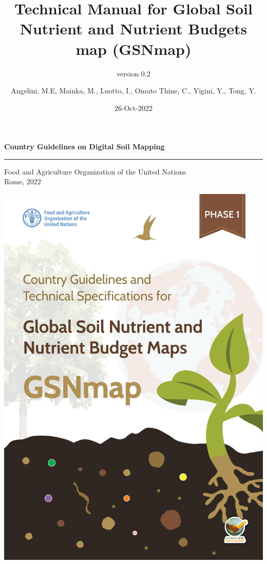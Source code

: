 \documentclass[
  10pt,
  b5paper,
  oneside]{book}
\title{
Technical Manual for Global Soil Nutrient and Nutrient Budgets map (GSNmap)}
\subtitle{version 0.2}
\author{Angelini, M.E, Mainka, M., Luotto, I., Omuto Thine, C., Yigini, Y., Tong, Y.}
\date{26-Oct-2022}
\newcommand\blankpage{%
    \null
    \thispagestyle{empty}%
    \addtocounter{page}{-1}%
    \newpage}
\begin{document}
\maketitle

\pagestyle{plain}

\afterpage{\blankpage}
\thispagestyle{empty}
\begin{titlepage}
    \begin{center}
        \vspace*{4cm}
        \Large

        \textcolor{astral}{\textbf{Country Guidelines on Digital Soil Mapping\\}}
        \vspace{0.5cm}
        \normalsize
        \vfill
        \noindent
        {\color{astral}\rule{\linewidth}{0.5mm} }

        Food and Agriculture Organization of the United Nations\\
	Rome, 2022
    \end{center}
\end{titlepage}



\frontmatter
{}   
\tableofcontents
\listoffigures
\listoftables
\nopagebreak[5]

\includegraphics{images/frontcover.jpg}
\end{document}
